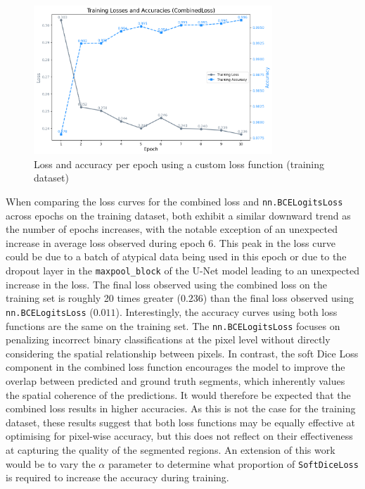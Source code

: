 \documentclass[12pt]{report}
\newcommand{\inlinecode}[1]{\lstinline[style=inline]{#1}}
\begin{document}
\begin{figure}[ht]
    \centering
    \includegraphics[width=0.8\textwidth]{combinedloss.png}
    \caption{Loss and accuracy per epoch using a custom loss function (training dataset)}
    \label{fig:combined_loss}
\end{figure}

When comparing the loss curves for the combined loss and \inlinecode{nn.BCELogitsLoss} across epochs on the training dataset, both exhibit a similar downward trend as the number of epochs increases, with the notable exception of an unexpected increase in average loss observed during epoch 6. This peak in the loss curve could be due to a batch of atypical data being used in this epoch or due to the dropout layer in the \inlinecode{maxpool_block} of the U-Net model leading to an unexpected increase in the loss. The final loss observed using the combined loss on the training set is roughly 20 times greater ($0.236$) than the final loss observed using \inlinecode{nn.BCELogitsLoss} ($0.011$). Interestingly, the accuracy curves using both loss functions are the same on the training set. The \inlinecode{nn.BCELogitsLoss} focuses on penalizing incorrect binary classifications at the pixel level without directly considering the spatial relationship between pixels. In contrast, the soft Dice Loss component in the combined loss function encourages the model to improve the overlap between predicted and ground truth segments, which inherently values the spatial coherence of the predictions. It would therefore be expected that the combined loss results in higher accuracies. As this is not the case for the training dataset, these results suggest that both loss functions may be equally effective at optimising for pixel-wise accuracy, but this does not reflect on their effectiveness at capturing the quality of the segmented regions. An extension of this work would be to vary the $\alpha$ parameter to determine what proportion of \inlinecode{SoftDiceLoss} is required to increase the accuracy during training.
\end{document}
